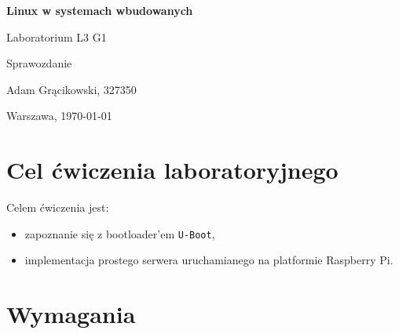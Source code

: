 \documentclass{article}
\begin{document}
\begin{titlepage}
    \centering
    \vfill    
    {\fontsize{40}{20}\selectfont \textbf{Linux w systemach wbudowanych} \par}
    \vspace{2cm}
    {\fontsize{30}{20}\selectfont Laboratorium L3 G1\par}
    \vspace{2cm}
    {\fontsize{20}{20}\selectfont Sprawozdanie\par}
    \vfill
    {\fontsize{10}{20}\selectfont Adam Grącikowski, 327350\par}
    \vspace{1cm}
    Warszawa, \today
\end{titlepage}



\tableofcontents
\newpage
\section{Cel ćwiczenia laboratoryjnego}

Celem ćwiczenia jest:

\begin{itemize}
    \item zapoznanie się z bootloader’em \texttt{U-Boot},
    \item implementacja prostego serwera uruchamianego na platformie Raspberry Pi.
\end{itemize}

\section{Wymagania}
\end{document}
